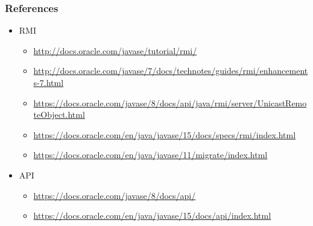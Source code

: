 \documentclass[10pt,xcolor=pdflatex]{beamer}
\begin{document}
\begin{frame}[containsverbatim]\frametitle{References}
\begin{itemize}
	\item RMI
      \begin{itemize}
    	\item \url{http://docs.oracle.com/javase/tutorial/rmi/}
        \item \url{http://docs.oracle.com/javase/7/docs/technotes/guides/rmi/enhancements-7.html}
        \item \url{https://docs.oracle.com/javase/8/docs/api/java/rmi/server/UnicastRemoteObject.html}
        \item \url{https://docs.oracle.com/en/java/javase/15/docs/specs/rmi/index.html}
        \item \url{https://docs.oracle.com/en/java/javase/11/migrate/index.html}
      \end{itemize}
	\item API
      \begin{itemize}
        \item \url{https://docs.oracle.com/javase/8/docs/api/}
        \item \url{https://docs.oracle.com/en/java/javase/15/docs/api/index.html}
      \end{itemize}
\end{itemize}
\end{frame}


\end{document}
